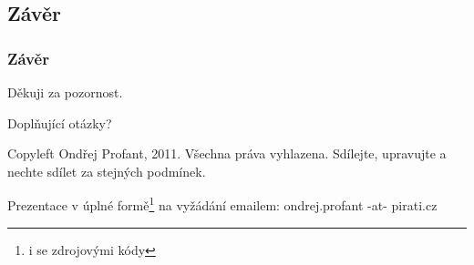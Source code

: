 \documentclass[xetex]{beamer}
\begin{document}
\subsection{Závěr}
\begin{frame}
  \frametitle{Závěr}
	Děkuji za pozornost.

	\bigskip
	
	Doplňující otázky?

\bigskip

\bigskip

\scriptsize
Copyleft Ondřej Profant, 2011. Všechna práva vyhlazena. Sdílejte, upravujte a nechte sdílet za stejných podmínek. 

Prezentace v úplné formě\footnote{i se zdrojovými kódy} na vyžádání emailem: ondrej.profant -at- pirati.cz 
\end{frame}
\end{document}

